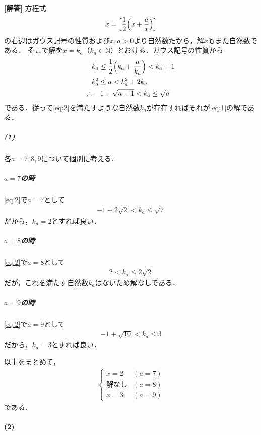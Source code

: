\documentclass[../../main.tex]{subfiles}
\begin{document}
\begin{oframed}
  
\end{oframed}

{\bf [解答]}
方程式
\begin{align}
  x=\Bigl[\dfrac{1}{2}\Bigl(x+\dfrac{a}{x}\Bigr)\Bigr] \label{eq:1}
\end{align}
の右辺はガウス記号の性質および$x,a>0$より自然数だから，解$x$もまた自然数である．
そこで解を$x=k_a$（$k_a\in\mathbb N$）とおける．ガウス記号の性質から
\begin{align}
  & k_a\le\dfrac{1}{2}\Bigl(k_a+\dfrac{a}{k_a}\Bigr)<k_a+1 \\
  & k_a^2\le a<k_a^2+2k_a \\
  \therefore
  & -1+\sqrt{a+1}<k_a\le\sqrt{a} \label{eq:2}
\end{align}
である．従って\cref{eq:2}を満たすような自然数$k_a$が存在すればそれが\cref{eq:1}の解である．

\subparagraph{(1)}

各$a=7,8,9$について個別に考える．

\subparagraph{$a=7$の時}

\cref{eq:2}で$a=7$として
\begin{align}
  -1+2\sqrt{2}<k_a\le\sqrt{7}
\end{align}
だから，$k_a=2$とすれば良い．

\subparagraph{$a=8$の時}

\cref{eq:2}で$a=8$として
\begin{align}
  2<k_a\le 2\sqrt{2}
\end{align}
だが，これを満たす自然数$k_a$はないため解なしである．

\subparagraph{$a=9$の時}

\cref{eq:2}で$a=9$として
\begin{align}
  -1+\sqrt{10}<k_a\le 3
\end{align}
だから，$k_a=3$とすれば良い．
\casesend

以上をまとめて，
\begin{align}
  \begin{cases}
    x = 2 & (a=7) \\
    \text{解なし} & (a=8) \\
    x = 3 & (a=9)
  \end{cases}
\end{align}
である．

\paragraph{(2)}
\end{document}
